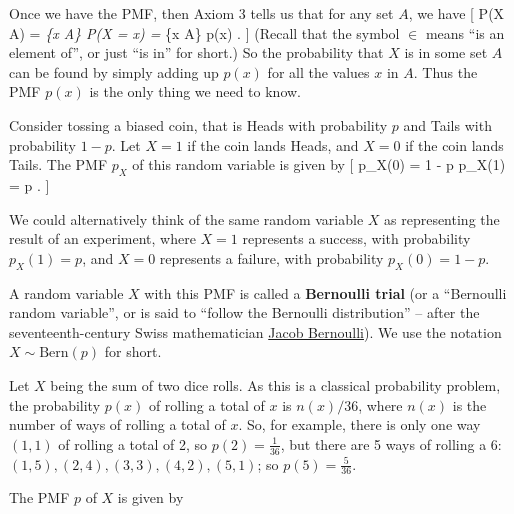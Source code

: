 \documentclass[
  letterpaper,
]{report}
\theoremstyle{definition}
\theoremstyle{definition}
\theoremstyle{remark}
\begin{document}
Once we have the PMF, then Axiom 3 tells us that for any set \(A\), we
have {[} \mathbb P(X \in A) = \sum\emph{\{x \in A\} \mathbb P(X = x) =
\sum}\{x \in A\} p(x) . {]} (Recall that the symbol \(\in\) means ``is
an element of'', or just ``is in'' for short.) So the probability that
\(X\) is in some set \(A\) can be found by simply adding up \(p(x)\) for
all the values \(x\) in \(A\). Thus the PMF \(p(x)\) is the only thing
we need to know.

Consider tossing a biased coin, that is Heads with probability \(p\) and
Tails with probability \(1-p\). Let \(X = 1\) if the coin lands Heads,
and \(X = 0\) if the coin lands Tails. The PMF \(p_X\) of this random
variable is given by {[} p\_X(0) = 1 - p \qquad p\_X(1) = p . {]}

We could alternatively think of the same random variable \(X\) as
representing the result of an experiment, where \(X = 1\) represents a
success, with probability \(p_X(1) = p\), and \(X = 0\) represents a
failure, with probability \(p_X(0) = 1 - p\).

A random variable \(X\) with this PMF is called a \textbf{Bernoulli
trial} (or a ``Bernoulli random variable'', or is said to ``follow the
Bernoulli distribution'' -- after the seventeenth-century Swiss
mathematician
\href{https://mathshistory.st-andrews.ac.uk/Biographies/Bernoulli_Jacob/}{Jacob
Bernoulli}). We use the notation \(X \sim \text{Bern}(p)\) for short.

Let \(X\) being the sum of two dice rolls. As this is a classical
probability problem, the probability \(p(x)\) of rolling a total of
\(x\) is \(n(x) / 36\), where \(n(x)\) is the number of ways of rolling
a total of \(x\). So, for example, there is only one way \((1,1)\) of
rolling a total of 2, so \(p(2) = \frac1{36}\), but there are 5 ways of
rolling a 6: \((1,5), (2,4), (3, 3), (4, 2), (5, 1)\); so
\(p(5) = \frac5{36}\).

The PMF \(p\) of \(X\) is given by
\end{document}
